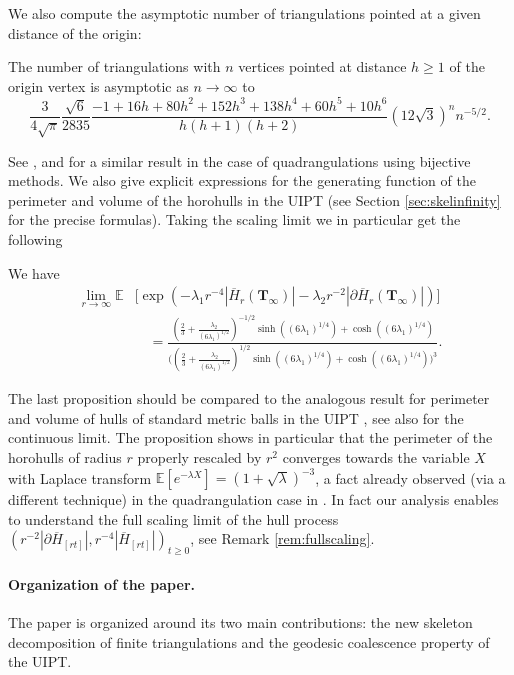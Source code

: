 \documentclass[AHL,XML,longabstracts,Unicode,NoSaveZebib]{cedram}
\begin{document}
We  also compute the asymptotic number of triangulations pointed at a given distance of the origin:
\begin{proposition} \label{prop:UIPTdisth}
The number of triangulations with $n$ vertices pointed at distance $h \geq 1$ of the origin vertex is asymptotic as $n \to \infty$ to
\[ \frac{3}{4 \sqrt \pi} \frac{\sqrt{6}}{2835} \frac{-1+16h+80h^2+152h^3+138h^4+60h^5+10h^6}{h(h+1)(h+2)}
\left( 12\sqrt{3} \right)^{n} n^{-5/2}.
\]
\end{proposition}
See \cite[Equation 4.19]{BDFG03}, \cite[Equation 5.1]{BDFG} and \cite[Lemma 2.5]{CD06} for a similar result in the case of quadrangulations using bijective methods. We also give explicit expressions for the generating function of the perimeter and volume of the horohulls in the UIPT (see Section \ref{sec:skelinfinity} for the precise formulas). Taking the  scaling limit we in particular get the following


\begin{proposition} We have
\begin{align*}
\lim_{r \to \infty}
\mathbb E &\Big[
\exp \left(- \lambda_1 r^{-4}|\overline{H}_{r} (\mathbf{T}_{\infty})| - \lambda_2 r^{-2} |\partial \overline{H}_{r} (\mathbf{T}_{\infty})| \right)\Big]\\
& \quad =
\frac
{
\left(\frac{2}{3} + \frac{\lambda_2}{(6 \lambda_1)^{1/2}} \right)^{-1/2}
\sinh \left( (6 \lambda_1)^{1/4}\right) + \cosh \left( (6 \lambda_1)^{1/4}\right)
}
{\Bigg( \left(\frac{2}{3} + \frac{\lambda_2}{(6 \lambda_1)^{1/2}} \right)^{1/2}
\sinh \left( (6 \lambda_1)^{1/4}\right) + \cosh \left( (6 \lambda_1)^{1/4}\right)\Bigg)^3}.
\end{align*}
\end{proposition}
The last proposition should be compared to the analogous result for perimeter and volume of hulls of standard metric balls in the UIPT \cite{M}, see also \cite{CLG16} for the continuous limit. The proposition shows in particular that the perimeter of the horohulls of radius $r$ properly rescaled by $r^{2}$ converges towards the variable $X$ with Laplace transform $ \mathbb{E}[e^{-\lambda X}] = (1+\sqrt{\lambda})^{-3}$, a fact already observed (via a different technique) in the quadrangulation case in \cite{CMM10}. In fact our analysis enables to understand the full scaling limit of the hull process $( r^{-2}  |\partial \overline{H}_{[rt]}|, r^{-4} | \overline{H}_{[rt]}|)_{t \geq 0}$, see Remark \ref{rem:fullscaling}. \medskip

\paragraph{Organization of the paper.} The paper is organized around its two main contributions: the new skeleton decomposition of finite triangulations and the geodesic coalescence property of the UIPT.
\end{document}
